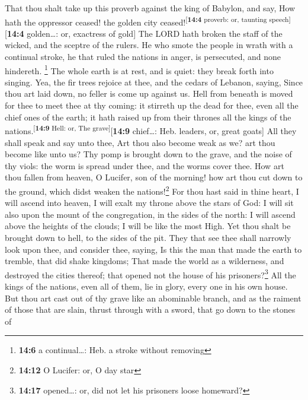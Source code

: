  That thou shalt take up this proverb against the king of
Babylon, and say, How hath the oppressor ceased! the golden city
ceased!\textsuperscript{{[}\textbf{14:4} proverb: or, taunting
speech{]}}{[}\textbf{14:4} golden\ldots: or, exactress of gold{]}
 The LORD hath broken the staff of the wicked, and the
sceptre of the rulers.  He who smote the people in wrath
with a continual stroke, he that ruled the nations in anger, is
persecuted, and none hindereth. \footnote{\textbf{14:6} a
  continual\ldots: Heb. a stroke without removing}  The
whole earth is at rest, and is quiet: they break forth into singing.
 Yea, the fir trees rejoice at thee, and the cedars of
Lebanon, saying, Since thou art laid down, no feller is come up against
us.  Hell from beneath is moved for thee to meet thee at
thy coming: it stirreth up the dead for thee, even all the chief ones of
the earth; it hath raised up from their thrones all the kings of the
nations.\textsuperscript{{[}\textbf{14:9} Hell: or, The
grave{]}}{[}\textbf{14:9} chief\ldots: Heb. leaders, or, great goats{]}
 All they shall speak and say unto thee, Art thou also
become weak as we? art thou become like unto us?  Thy
pomp is brought down to the grave, and the noise of thy viols: the worm
is spread under thee, and the worms cover thee.  How art
thou fallen from heaven, O Lucifer, son of the morning! how art thou cut
down to the ground, which didst weaken the nations!\footnote{\textbf{14:12}
  O Lucifer: or, O day star}  For thou hast said in thine
heart, I will ascend into heaven, I will exalt my throne above the stars
of God: I will sit also upon the mount of the congregation, in the sides
of the north:  I will ascend above the heights of the
clouds; I will be like the most High.  Yet thou shalt be
brought down to hell, to the sides of the pit.  They that
see thee shall narrowly look upon thee, and consider thee, saying, Is
this the man that made the earth to tremble, that did shake kingdoms;
 That made the world as a wilderness, and destroyed the
cities thereof; that opened not the house of his prisoners?\footnote{\textbf{14:17}
  opened\ldots: or, did not let his prisoners loose homeward?}
 All the kings of the nations, even all of them, lie in
glory, every one in his own house.  But thou art cast out
of thy grave like an abominable branch, and as the raiment of those that
are slain, thrust through with a sword, that go down to the stones of
